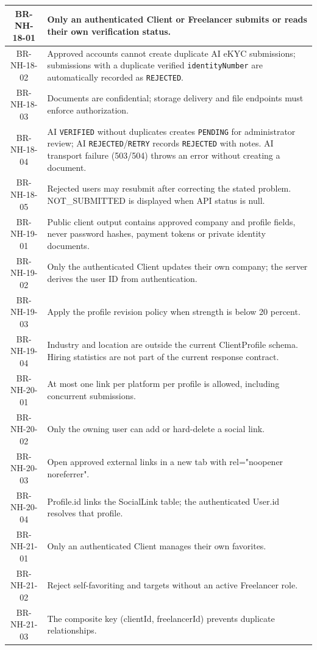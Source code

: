 \begin{longtable}{|c|p{12cm}|}
BR-NH-18-01 & Only an authenticated Client or Freelancer submits or reads their own verification status. \\ \hline
BR-NH-18-02 & Approved accounts cannot create duplicate AI eKYC submissions; submissions with a duplicate verified \texttt{identityNumber} are automatically recorded as \texttt{REJECTED}. \\ \hline
BR-NH-18-03 & Documents are confidential; storage delivery and file endpoints must enforce authorization. \\ \hline
BR-NH-18-04 & AI \texttt{VERIFIED} without duplicates creates \texttt{PENDING} for administrator review; AI \texttt{REJECTED}/\texttt{RETRY} records \texttt{REJECTED} with notes. AI transport failure (503/504) throws an error without creating a document. \\ \hline
BR-NH-18-05 & Rejected users may resubmit after correcting the stated problem. NOT\_SUBMITTED is displayed when API status is null. \\ \hline
BR-NH-19-01 & Public client output contains approved company and profile fields, never password hashes, payment tokens or private identity documents. \\ \hline
BR-NH-19-02 & Only the authenticated Client updates their own company; the server derives the user ID from authentication. \\ \hline
BR-NH-19-03 & Apply the profile revision policy when strength is below 20 percent. \\ \hline
BR-NH-19-04 & Industry and location are outside the current ClientProfile schema. Hiring statistics are not part of the current response contract. \\ \hline
BR-NH-20-01 & At most one link per platform per profile is allowed, including concurrent submissions. \\ \hline
BR-NH-20-02 & Only the owning user can add or hard-delete a social link. \\ \hline
BR-NH-20-03 & Open approved external links in a new tab with rel="noopener noreferrer". \\ \hline
BR-NH-20-04 & Profile.id links the SocialLink table; the authenticated User.id resolves that profile. \\ \hline
BR-NH-21-01 & Only an authenticated Client manages their own favorites. \\ \hline
BR-NH-21-02 & Reject self-favoriting and targets without an active Freelancer role. \\ \hline
BR-NH-21-03 & The composite key (clientId, freelancerId) prevents duplicate relationships. \\ \hline

\end{longtable}
